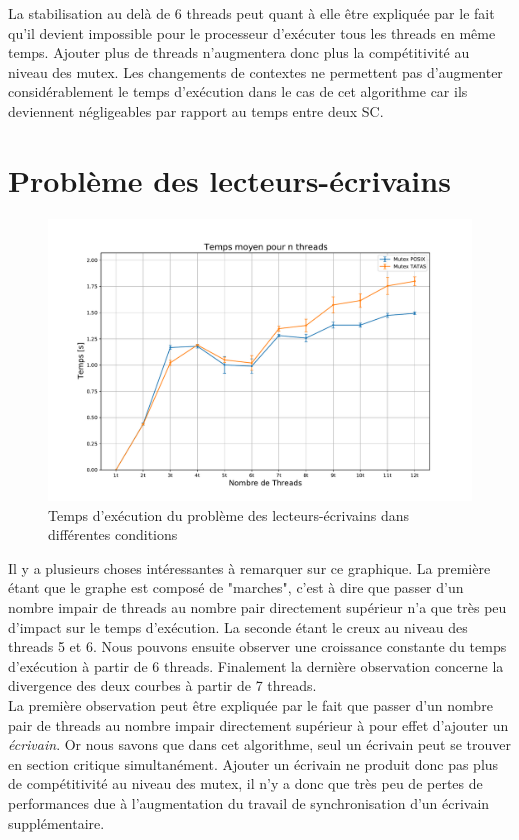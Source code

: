\noindent La stabilisation au delà de 6 threads peut quant à elle être expliquée par le fait qu'il devient impossible pour le processeur d'exécuter tous les threads en même temps. Ajouter plus de threads n'augmentera donc plus la compétitivité au niveau des mutex. Les changements de contextes ne permettent pas d'augmenter considérablement le temps d'exécution dans le cas de cet algorithme car ils deviennent négligeables par rapport au temps entre deux SC.


\section{Problème des lecteurs-écrivains}

\begin{figure}[H]
    \centering
    \includegraphics[scale=0.45]{img/readwrt.pdf}
    \caption{Temps d'exécution du problème des lecteurs-écrivains dans différentes conditions}
    \label{pic:readwrt}
\end{figure}

\noindent Il y a plusieurs choses intéressantes à remarquer sur ce graphique. La première étant que le graphe est composé de "marches", c'est à dire que passer d'un nombre impair de threads au nombre pair directement supérieur n'a que très peu d'impact sur le temps d'exécution. La seconde étant le creux au niveau des threads 5 et 6. Nous pouvons ensuite observer une croissance constante du temps d'exécution à partir de 6 threads. Finalement la dernière observation concerne la divergence des deux courbes à partir de 7 threads.\\

\noindent La première observation peut être expliquée par le fait que passer d'un nombre pair de threads au nombre impair directement supérieur à pour effet d'ajouter un \textit{écrivain}. Or nous savons que dans cet algorithme, seul un écrivain peut se trouver en section critique simultanément. Ajouter un écrivain ne produit donc pas plus de compétitivité au niveau des mutex, il n'y a donc que très peu de pertes de performances due à l'augmentation du travail de synchronisation d'un écrivain supplémentaire.\\

